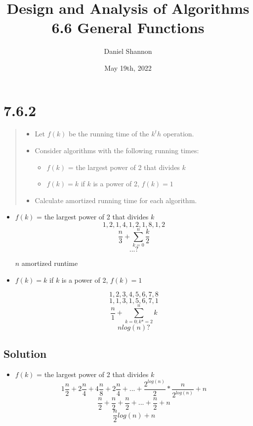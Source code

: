 \documentclass[12pt, letterpaper, twoside]{article}
\title{%
Design and Analysis of Algorithms\\
\large 6.6 General Functions
}
\author{Daniel Shannon}
\date{May 19th, 2022}
\begin{document}
\begin{titlepage}
\maketitle
\end{titlepage}

\section*{7.6.2}
\begin{quote}
\begin{itemize}
    \item Let $f(k)$ be the running time of the $k^th$ operation.
    \item Consider algorithms with the following running times:
    \begin{itemize}
        \item $f(k)$ = the largest power of 2 that divides $k$
        \item $f(k)=k$ if $k$ is a power of 2, $f(k)=1$
    \end{itemize}
    \item Calculate amortized running time for each algorithm.
\end{itemize}
\end{quote}
\begin{itemize}
    \item $f(k)$ = the largest power of 2 that divides $k$
    $$1,2,1,4,1,2,1,8,1,2$$
    $$\frac{n}{3}+\sum_{k=0}^{n}\frac{k}{2}$$
    $$...?$$
    
    $n$ amortized runtime

    \item $f(k)=k$ if $k$ is a power of 2, $f(k)=1$
    
    $$1,2,3,4,5,6,7,8$$
    $$1,1,3,1,5,6,7,1$$
    $$\frac{n}{1}+\sum_{k=0;k*=2}^{n}k$$
    $$nlog(n)?$$
    

\end{itemize}

\subsection*{Solution}
\begin{itemize}
    \item $f(k)$ = the largest power of 2 that divides $k$
    $$1\frac{n}{2}+2\frac{n}{4}+4\frac{n}{8}+2\frac{n}{4}+...+\frac{2^{log(n)}}{2}*\frac{n}{2^{log(n)}}+n$$
    $$\frac{n}{2}+\frac{n}{2}+\frac{n}{2}+...+\frac{n}{2}+n$$
    $$\frac{n}{2}log(n)+n$$
\end{itemize}
\end{document}
